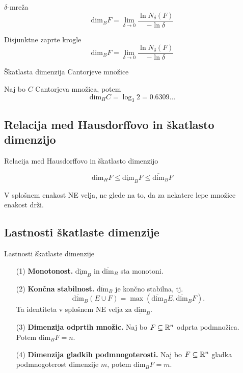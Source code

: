 \documentclass[10pt]{beamer}
\begin{document}
\begin{frame}[t]{\(\delta\)-mreža}  
    \[\text{dim}_B F = \lim_{\delta \to 0} \frac{\ln N_\delta(F)}{-\ln \delta}\]
    \begin{center}
        \scalebox{0.9}{
            \drawMesh
        }        
    \end{center}   
\end{frame}

\begin{frame}[t]{Disjunktne zaprte krogle}  
    \[\text{dim}_B F = \lim_{\delta \to 0} \frac{\ln N_\delta(F)}{-\ln \delta}\]
\end{frame}

\begin{frame}[t]{Škatlasta dimenzija Cantorjeve množice}  
    \begin{primer}
        Naj bo \(C\) Cantorjeva množica, potem 
        \[\text{dim}_H C = \log_3 2 = 0.6309\ldots\]
    \end{primer}
\end{frame}

\subsection{Relacija med Hausdorffovo in škatlasto dimenzijo}
\begin{frame}[t]{Relacija med Hausdorffovo in škatlasto dimenzijo}
    \begin{trditev}
        \[\text{dim}_H F \leq \underline{\text{dim}}_B F \leq \overline{\text{dim}}_B F\]
    \end{trditev}

    \pause
    \begin{opomba}
        V splošnem enakost NE velja, ne glede na to, da za nekatere lepe množice enakost drži.
    \end{opomba}
\end{frame}

\subsection{Lastnosti škatlaste dimenzije}
\begin{frame}[t]{Lastnosti škatlaste dimenzije}
    \begin{itemize}
        \item[(1)] \textbf{Monotonost.} \(\underline{\text{dim}}_B\) in \(\overline{\text{dim}}_B\) sta monotoni.
        \pause
        \item[(2)] \textbf{Končna stabilnost.} \(\overline{\text{dim}}_B\) je končno stabilna, tj. 
        \[\overline{\text{dim}}_B (E \cup F) = \max (\overline{\text{dim}}_B E, \overline{\text{dim}}_B F).\]
        Ta identiteta v splošnem NE velja za \(\underline{\text{dim}}_B\).
        \pause
        \item[(3)] \textbf{Dimenzija odprtih množic.} Naj bo \(F \subseteq \mathbb{R}^n\) odprta podmnožica. Potem \(\text{dim}_B F = n\).
        \pause
        \item[(4)] \textbf{Dimenzija gladkih podmnogoterosti.} Naj bo \(F \subseteq \mathbb{R}^n\) gladka podmnogoterost dimenzije \(m\), potem \(\text{dim}_B F = m\). 
    \end{itemize}
\end{frame}
\end{document}
